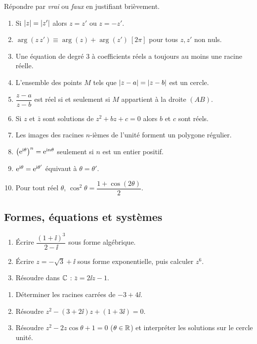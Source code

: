 Répondre par \emph{vrai} ou \emph{faux} en justifiant brièvement.
\begin{enumerate}
	\item Si $\left|z\right| = \left|z'\right|$ alors $z = z'$ ou $z = -z'$.
	\item $\arg(z\,z') \equiv \arg(z) + \arg(z')\ [2\pi]$ pour tous $z, z'$ non nuls.
	\item Une équation de degré $3$ à coefficients réels a toujours au moins une
	racine réelle.
	\item L'ensemble des points $M$ tels que $\left|z - a\right| = \left|z - b\right|$ est un
	cercle.
	\item $\dfrac{z - a}{z - b}$ est réel si et seulement si $M$ appartient à la
	droite $(AB)$.
	\item Si $z$ et $\bar z$ sont solutions de $z^2 + bz + c = 0$ alors $b$ et
	$c$ sont réels.
	\item Les images des racines $n$-ièmes de l'unité forment un polygone
	régulier.
	\item $\bigl(\mathrm{e}^{\mathrm{i}\theta}\bigr)^{n} = \mathrm{e}^{\mathrm{i} n\theta}$ seulement si
	$n$ est un entier positif.
	\item $\mathrm{e}^{\mathrm{i}\theta} = \mathrm{e}^{\mathrm{i}\theta'}$ équivaut à $\theta = \theta'$.
	\item Pour tout réel $\theta$, $\cos^2\theta = \dfrac{1+\cos(2\theta)}{2}$.
\end{enumerate}

\subsection{Formes, équations et systèmes}

\begin{enumerate}
	\item Écrire $\dfrac{(1 + \ii)^3}{2 - \ii}$ sous forme algébrique.
	\item Écrire $z = -\sqrt3 + \ii$ sous forme exponentielle, puis calculer
	$z^{6}$.
	\item Résoudre dans $\mathbb{C}$ : $\bar z = 2\ii z - 1$.
\end{enumerate}

\begin{enumerate}
	\item Déterminer les racines carrées de $-3 + 4\ii$.
	\item Résoudre $z^2 - (3 + 2\ii)z + (1 + 3\ii) = 0$.
	\item Résoudre $z^2 - 2z\cos\theta + 1 = 0$ ($\theta \in \mathbb{R}$) et interpréter
	les solutions sur le cercle unité.
\end{enumerate}

